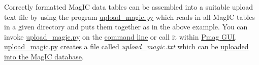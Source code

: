\documentclass[11pt]{book}
\begin{document}
{Correctly formatted MagIC data tables can be assembled into a suitable upload text file by using the program \href{#upload_magic.py}{upload\_magic.py} which reads in all MagIC tables in a given directory and puts them together as in the above example.  You can invoke \href{#upload_magic.py}{upload\_magic.py} on the \href{#command_line}{command line} or call it within  \href{#pmag_gui.py}{Pmag GUI}.     \href{#upload_magic.py}{upload\_magic.py} creates a file called {\it upload\_magic.txt} which can be \href{#magic_upload}{uploaded into the MagIC database}.



%
%
%
%
%
%
%
%
%
%
%
%
%
%
%
%
%
%





}
\end{document}
